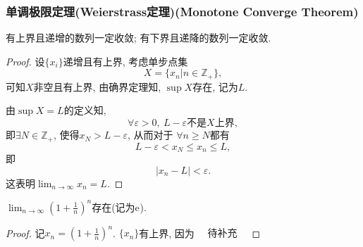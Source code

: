 \subsubsection[单调极限定理]{单调极限定理(Weierstrass定理)(Monotone Converge Theorem)}
\begin{theorem}[单调极限定理]
  有上界且递增的数列一定收敛; 有下界且递降的数列一定收敛.
\end{theorem}
\begin{proof}
  设$\{ x_i \}$递增且有上界, 考虑单步点集
  \begin{equation}
    X = \{ x_n | n\in \mathbb{Z}_{+} \},
  \end{equation}
  可知$X$非空且有上界, 由确界定理知, $\sup X$存在, 记为$L$.

  由$\sup X = L$的定义知,
  \begin{equation}
    \forall \varepsilon >0 ,\ L- \varepsilon \text{不是$X$上界},
  \end{equation}
  即$\exists  N\in \mathbb{Z}_{+}$, 使得$x_N > L-\varepsilon $, 从而对于
  $\forall n \ge  N$都有
  \begin{equation}
    L-\varepsilon < x_N \le  x_n \le  L,
  \end{equation}
  即
  \begin{equation}
    \left| x_n - L  \right| < \varepsilon.
  \end{equation}
  这表明$\displaystyle \lim_{n \to \infty}x_n = L$.
\end{proof}


\begin{theorem}[Euler]
    $\displaystyle \lim_{n \to \infty}\left( 1+\frac{1}{n} \right) ^{n}$存在(记为$\mathrm{e}^{}$).
\end{theorem}

\begin{proof}
    记$x_n = \left( 1+\frac{1}{n} \right) ^{n}$.
    $\{ x_n \}$有上界, 因为
    $\boxed{ \quad \text{待补充}\quad }$
\end{proof}

